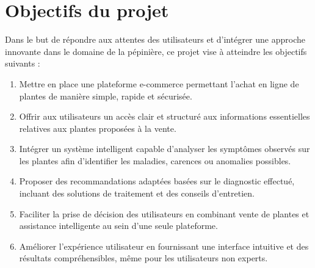 \section{Objectifs du projet}
Dans le but de répondre aux attentes des utilisateurs et d'intégrer une approche 
innovante dans le domaine de la pépinière, ce projet vise à atteindre les 
objectifs suivants :
\begin{enumerate}
\item Mettre en place une plateforme e-commerce permettant l'achat en ligne de 
plantes de manière simple, rapide et sécurisée.
\item Offrir aux utilisateurs un accès clair et structuré aux informations 
essentielles relatives aux plantes proposées à la vente.
\item Intégrer un système intelligent capable d'analyser les symptômes observés 
sur les plantes afin d'identifier les maladies, carences ou anomalies possibles.
\item Proposer des recommandations adaptées basées sur le diagnostic effectué, 
incluant des solutions de traitement et des conseils d'entretien.
\item Faciliter la prise de décision des utilisateurs en combinant vente de 
plantes et assistance intelligente au sein d'une seule plateforme.
\item Améliorer l'expérience utilisateur en fournissant une interface intuitive 
et des résultats compréhensibles, même pour les utilisateurs non experts.
\end{enumerate}
